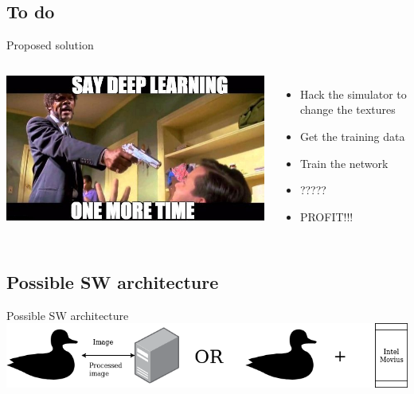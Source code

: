 \documentclass{beamer}
\begin{document}
    \subsection{To do}
    \begin{frame}{Proposed solution}

    \pause

    \begin{columns}

        \includegraphics[width=\textwidth]{fig/meme.jpeg}\pause


    \begin{itemize}
        \item Hack the simulator to change the textures\pause
        \item Get the training data\pause
        \item Train the network\pause
        \item ?????\pause
        \item PROFIT!!!\pause
    \end{itemize}
    \end{columns}
    \end{frame}

    \subsection{Possible SW architecture}
    \begin{frame}{Possible SW architecture}
        \includegraphics[width=\textwidth]{fig/Duckietown.png}
    \end{frame}
\end{document}
